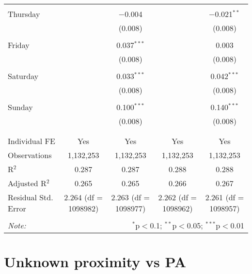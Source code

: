 \documentclass[
]{article}
\begin{document}
\begin{table}[!htbp]
{\begin{tabular}{@{\extracolsep{5pt}}lcccc}
  & & & & \\ 
 Thursday &  & $-$0.004 &  & $-$0.021$^{**}$ \\ 
  &  & (0.008) &  & (0.008) \\ 
  & & & & \\ 
 Friday &  & 0.037$^{***}$ &  & 0.003 \\ 
  &  & (0.008) &  & (0.008) \\ 
  & & & & \\ 
 Saturday &  & 0.033$^{***}$ &  & 0.042$^{***}$ \\ 
  &  & (0.008) &  & (0.008) \\ 
  & & & & \\ 
 Sunday &  & 0.100$^{***}$ &  & 0.140$^{***}$ \\ 
  &  & (0.008) &  & (0.008) \\ 
  & & & & \\ 
\hline \\[-1.8ex] 
Individual FE & Yes & Yes & Yes & Yes \\ 
Observations & 1,132,253 & 1,132,253 & 1,132,253 & 1,132,253 \\ 
R$^{2}$ & 0.287 & 0.287 & 0.288 & 0.288 \\ 
Adjusted R$^{2}$ & 0.265 & 0.265 & 0.266 & 0.267 \\ 
Residual Std. Error & 2.264 (df = 1098982) & 2.263 (df = 1098977) & 2.262 (df = 1098962) & 2.261 (df = 1098957) \\ 
\hline 
\hline \\[-1.8ex] 
\textit{Note:}  & \multicolumn{4}{r}{$^{*}$p$<$0.1; $^{**}$p$<$0.05; $^{***}$p$<$0.01} \\ 
\end{tabular}
} 
\end{table} 
\newpage
\section{Unknown proximity vs PA}
\end{document}
